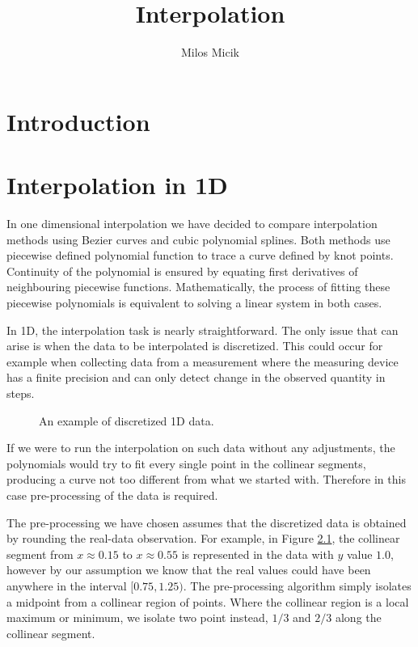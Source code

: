 \documentclass[a4paper,10pt]{report}
\title{Interpolation} %
\author{Milos Micik}
\begin{document}
\maketitle

\begin{abstract}
\end{abstract}

\chapter{Introduction}

\chapter{Interpolation in 1D}
In one dimensional interpolation we have decided to compare interpolation methods using Bezier curves and cubic polynomial splines. Both methods use piecewise defined polynomial function to trace a curve defined by knot points. Continuity of the polynomial is ensured by equating first derivatives of neighbouring piecewise functions. Mathematically, the process of fitting these piecewise polynomials is equivalent to solving a linear system in both cases.

In 1D, the interpolation task is nearly straightforward. The only issue that can arise is when the data to be interpolated is discretized. This could occur for example when collecting data from a measurement where the measuring device has a finite precision and can only detect change in the observed quantity in steps.
\begin{figure}[h]
 \centering
 
 \caption{An example of discretized 1D data.}
 \label{fig:1D_fun}
\end{figure}

If we were to run the interpolation on such data without any adjustments, the polynomials would try to fit every single point in the collinear segments, producing a curve not too different from what we started with. Therefore in this case pre-processing of the data is required.

The pre-processing we have chosen assumes that the discretized data is obtained by rounding the real-data observation. For example, in Figure \ref{fig:1D_fun}, the collinear segment from $x\approx0.15$ to $x\approx0.55$ is represented in the data with $y$ value $1.0$, however by our assumption we know that the real values could have been anywhere in the interval $[0.75, 1.25)$. The pre-processing algorithm simply isolates a midpoint from a collinear region of points. Where the collinear region is a local maximum or minimum, we isolate two point instead, $1/3$ and $2/3$ along the collinear segment.
\end{document}
